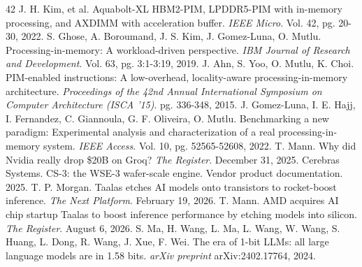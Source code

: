 \documentclass[10pt,twocolumn]{article}
\begin{document}
\begin{thebibliography}{42}
 J. H. Kim, et al. Aquabolt-XL HBM2-PIM, LPDDR5-PIM with in-memory processing, and AXDIMM with acceleration buffer. \textit{IEEE Micro}. Vol. 42, pg. 20-30, 2022.
 S. Ghose, A. Boroumand, J. S. Kim, J. Gomez-Luna, O. Mutlu. Processing-in-memory: A workload-driven perspective. \textit{IBM Journal of Research and Development}. Vol. 63, pg. 3:1-3:19, 2019.
 J. Ahn, S. Yoo, O. Mutlu, K. Choi. PIM-enabled instructions: A low-overhead, locality-aware processing-in-memory architecture. \textit{Proceedings of the 42nd Annual International Symposium on Computer Architecture (ISCA '15)}. pg. 336-348, 2015.
 J. Gomez-Luna, I. E. Hajj, I. Fernandez, C. Giannoula, G. F. Oliveira, O. Mutlu. Benchmarking a new paradigm: Experimental analysis and characterization of a real processing-in-memory system. \textit{IEEE Access}. Vol. 10, pg. 52565-52608, 2022.
 T. Mann. Why did Nvidia really drop \$20B on Groq? \textit{The Register}. December 31, 2025.
 Cerebras Systems. CS-3: the WSE-3 wafer-scale engine. Vendor product documentation. 2025.
 T. P. Morgan. Taalas etches AI models onto transistors to rocket-boost inference. \textit{The Next Platform}. February 19, 2026.
 T. Mann. AMD acquires AI chip startup Taalas to boost inference performance by etching models into silicon. \textit{The Register}. August 6, 2026.
 S. Ma, H. Wang, L. Ma, L. Wang, W. Wang, S. Huang, L. Dong, R. Wang, J. Xue, F. Wei. The era of 1-bit LLMs: all large language models are in 1.58 bits. \textit{arXiv preprint} arXiv:2402.17764, 2024.
\end{thebibliography}
\end{document}
